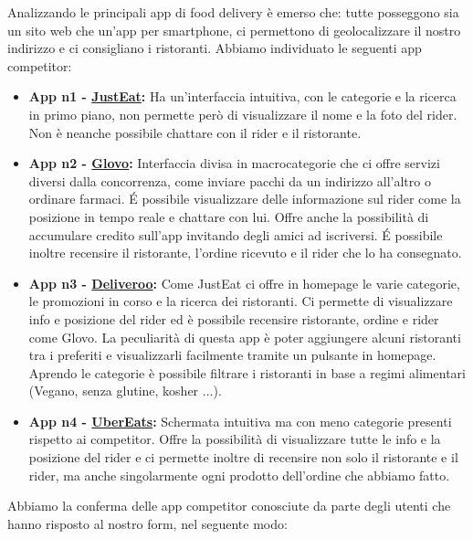 \documentclass{article}
\begin{document}
     \par
    Analizzando le principali app di food delivery è emerso che: tutte posseggono sia un sito web che un'app per smartphone, ci permettono di geolocalizzare il nostro indirizzo e ci consigliano i ristoranti.
    Abbiamo individuato le seguenti app competitor:
\begin{itemize}\item \textbf{App n1 - \href{https://www.justeat.it}{JustEat}:} Ha un’interfaccia intuitiva, con le categorie e la ricerca in primo piano, non permette però di visualizzare il nome e la foto del rider. Non è neanche possibile chattare con il rider e il ristorante.

        \item \textbf{App n2 - \href{https://glovoapp.com/it/it/}{Glovo}:} Interfaccia divisa in macrocategorie che ci offre servizi diversi dalla concorrenza, come inviare pacchi da un indirizzo all’altro o ordinare farmaci. É possibile visualizzare delle informazione sul rider come la posizione in tempo reale e chattare con lui. Offre anche la possibilità di accumulare credito sull’app invitando degli amici ad iscriversi. É possibile inoltre recensire il ristorante, l’ordine ricevuto e il rider che lo ha consegnato.

        \item \textbf{App n3 - \href{https://deliveroo.it/it/}{Deliveroo}:} Come JustEat ci offre in homepage le varie categorie, le promozioni in corso e la ricerca dei ristoranti. Ci permette di visualizzare info e posizione del rider ed è possibile recensire ristorante, ordine e rider come Glovo. La peculiarità di questa app è poter aggiungere alcuni ristoranti tra i preferiti e visualizzarli facilmente tramite un pulsante in homepage. Aprendo le categorie è possibile filtrare i ristoranti in base a regimi alimentari (Vegano, senza glutine, kosher ...).

        \item \textbf{App n4 - \href{https://www.ubereats.com/it/feed?diningMode=DELIVERY&pl=JTdCJTIyYWRkcmVzcyUyMiUzQSUyMkxhJTIwUGFnbm90dGVsbGElMjBHb3VybWV0JTIwLSUyMFZpYWxlJTIwSXBwb2NyYXRlJTIwLSUyMFJvbWElMjIlMkMlMjJyZWZlcmVuY2UlMjIlM0ElMjJDaElKVmREYVE2ZGhMeE1SbjI4Y1NxZG1nb0ElMjIlMkMlMjJyZWZlcmVuY2VUeXBlJTIyJTNBJTIyZ29vZ2xlX3BsYWNlcyUyMiUyQyUyMmxhdGl0dWRlJTIyJTNBNDEuOTA4NzUlMkMlMjJsb25naXR1ZGUlMjIlM0ExMi41MjAzODg3JTdE}{UberEats}:} Schermata intuitiva ma con meno categorie presenti rispetto ai competitor. Offre la possibilità di visualizzare tutte le info e la posizione del rider e ci permette inoltre di recensire non solo il ristorante e il rider, ma anche singolarmente ogni prodotto dell’ordine che abbiamo fatto.

\end{itemize}Abbiamo la conferma delle app competitor conosciute da parte degli utenti che hanno risposto al nostro form, nel seguente modo:
\end{document}
